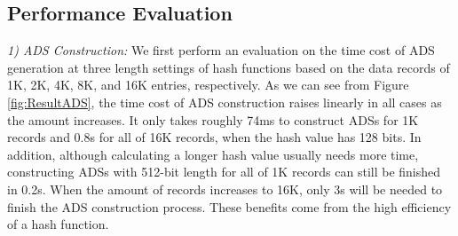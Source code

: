 \documentclass[11pt,divpdfm]{article}
\begin{document}
\subsection{Performance Evaluation}
\emph{1) ADS Construction:}
We first perform an evaluation on the time cost of ADS generation at three length settings of hash functions based on the data records of 1K, 2K, 4K, 8K, and 16K entries, respectively.
As we can see from Figure \ref{fig:ResultADS}, the time cost of ADS construction raises linearly in all cases as the amount increases.
It only takes roughly 74ms to construct ADSs for 1K records and 0.8s for all of 16K records, when the hash value has 128 bits.
In addition, although calculating a longer hash value usually needs more time, constructing ADSs with 512-bit length for all of 1K records can still be finished in 0.2s.
When the amount of records increases to 16K, only 3s will be needed to finish the ADS construction process.
These benefits come from the high efficiency of a hash function.
\end{document}
